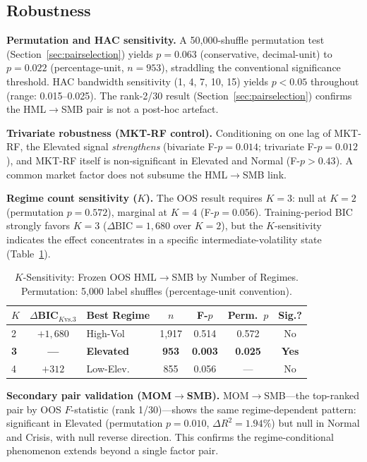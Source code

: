 \documentclass[sigconf,anonymous]{acmart}
\begin{document}
\subsection{Robustness}
\label{sec:robustness}
\label{sec:msvar}
\label{sec:trading}
\label{sec:risk_monitoring}

\textbf{Permutation and HAC sensitivity.}
A 50{,}000-shuffle permutation test (Section~\ref{sec:pairselection}) yields
$p = 0.063$ (conservative, decimal-unit) to $p = 0.022$ (percentage-unit,
$n = 953$), straddling the conventional significance threshold.
HAC bandwidth sensitivity (1, 4, 7, 10, 15) yields $p < 0.05$ throughout
(range: 0.015--0.025). The rank-2/30 result (Section~\ref{sec:pairselection})
confirms the HML$\to$SMB pair is not a post-hoc artefact.

\textbf{Trivariate robustness (MKT-RF control).}
Conditioning on one lag of MKT-RF, the Elevated signal \emph{strengthens}
(bivariate F-$p = 0.014$; trivariate F-$p = 0.012$), and MKT-RF itself is
non-significant in Elevated and Normal (F-$p > 0.43$).
A common market factor does not subsume the HML$\to$SMB link.

\textbf{Regime count sensitivity ($K$).}
The OOS result requires $K = 3$: null at $K = 2$ (permutation $p = 0.572$),
marginal at $K = 4$ (F-$p = 0.056$). Training-period BIC strongly favors
$K = 3$ ($\Delta\text{BIC} = 1{,}680$ over $K = 2$), but the $K$-sensitivity
indicates the effect concentrates in a specific intermediate-volatility state
(Table~\ref{tab:k_sensitivity}).

\begin{table}[t]
\centering
\caption{$K$-Sensitivity: Frozen OOS HML$\to$SMB by Number of Regimes.
Permutation: 5{,}000 label shuffles (percentage-unit convention).}
\label{tab:k_sensitivity}
\scriptsize
\begin{tabular}{@{}lclcccc@{}}
\toprule
$K$ & $\Delta$BIC$_{K\text{vs.}3}$ & Best Regime & $n$ & F-$p$ & Perm.\ $p$ & Sig.? \\
\midrule
2 & $+1{,}680$ & High-Vol & 1{,}917 & 0.514 & 0.572 & No \\
\textbf{3} & \textbf{---} & \textbf{Elevated} & \textbf{953} & \textbf{0.003} & \textbf{0.025} & \textbf{Yes} \\
4 & $+312$ & Low-Elev. & 855 & 0.056 & --- & No \\
\bottomrule
\end{tabular}
\end{table}

\textbf{Secondary pair validation (MOM$\to$SMB).}
MOM$\to$SMB---the top-ranked pair by OOS $F$-statistic (rank 1/30)---shows the
same regime-dependent pattern: significant in Elevated (permutation $p = 0.010$,
$\Delta R^2 = 1.94\%$) but null in Normal and Crisis, with null reverse direction.
This confirms the regime-conditional phenomenon extends beyond a single factor pair.
\end{document}
